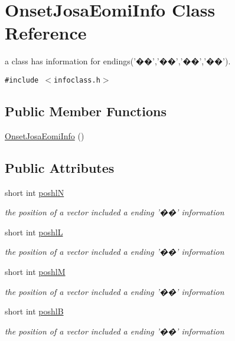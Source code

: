 \hypertarget{classOnsetJosaEomiInfo}{
\section{OnsetJosaEomiInfo Class Reference}
\label{classOnsetJosaEomiInfo}
}
a class has information for endings('��','��','��','��').  


{\tt \#include $<$infoclass.h$>$}

\subsection*{Public Member Functions}
\begin{CompactItemize}
\item 
\hyperlink{classOnsetJosaEomiInfo_2fd1f43b8d58e4d59fb61e9d871b03b2}{OnsetJosaEomiInfo} ()
\end{CompactItemize}
\subsection*{Public Attributes}
\begin{CompactItemize}
\item 
short int \hyperlink{classOnsetJosaEomiInfo_79ac54783c79418731ca41d48345109d}{poshlN}
\begin{CompactList}\small\item\em the position of a vector included a ending '��' information \item\end{CompactList}\item 
short int \hyperlink{classOnsetJosaEomiInfo_fba4da888544ee4eac3e3ec09916ea6a}{poshlL}
\begin{CompactList}\small\item\em the position of a vector included a ending '��' information \item\end{CompactList}\item 
short int \hyperlink{classOnsetJosaEomiInfo_47f91d9a8347a5d7f58946c3fbef2cf5}{poshlM}
\begin{CompactList}\small\item\em the position of a vector included a ending '��' information \item\end{CompactList}\item 
short int \hyperlink{classOnsetJosaEomiInfo_cab2eca3ece4492cc5ddbca7e1a68267}{poshlB}
\begin{CompactList}\small\item\em the position of a vector included a ending '��' information \item\end{CompactList}\end{CompactItemize}


